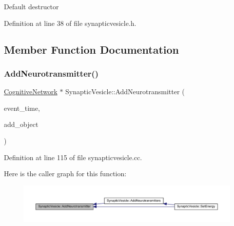 Default destructor 

Definition at line 38 of file synapticvesicle.\+h.



\subsection{Member Function Documentation}
\mbox{\label{class_synaptic_vesicle_a56d406fdd01f267d868caedb390080ff}} 
\subsubsection{\texorpdfstring{Add\+Neurotransmitter()}{AddNeurotransmitter()}}
{\footnotesize\ttfamily \hyperlink{class_cognitive_network}{Cognitive\+Network} $\ast$ Synaptic\+Vesicle\+::\+Add\+Neurotransmitter (\begin{DoxyParamCaption}\item[{std\+::chrono\+::time\+\_\+point$<$ \hyperlink{universe_8h_a0ef8d951d1ca5ab3cfaf7ab4c7a6fd80}{Clock} $>$}]{event\+\_\+time,  }\item[{\hyperlink{class_cognitive_network}{Cognitive\+Network} $\ast$}]{add\+\_\+object }\end{DoxyParamCaption})}



Definition at line 115 of file synapticvesicle.\+cc.

Here is the caller graph for this function\+:\nopagebreak
\begin{figure}[H]
\begin{center}
\leavevmode
\includegraphics[width=350pt]{class_synaptic_vesicle_a56d406fdd01f267d868caedb390080ff_icgraph}
\end{center}
\end{figure}
\mbox{\label{class_synaptic_vesicle_ac924e6b7b824066a89136e52f2d5ce80}} 
